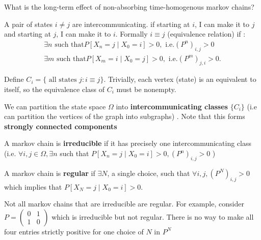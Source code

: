 \documentclass[a4paper]{article}
\begin{document}
\begin{note}
  What is the long-term effect of non-absorbing time-homogenous markov chains?
\end{note}

\begin{definition}
  A pair of states $i \neq j$ are intercommunicating. if starting at $i$, I can make it to  $j$ and starting at  $j$, I can make it to  $i$. Formally  $i \equiv j$ (equivalence relation) if :
   \begin{align*}
     \exists n \text{ such that} P[X_n=j \mid  X_0 = i] > 0, \text{ i.e.} (P^{n})_{i,j} > 0 \\
     \exists m \text{ such that} P[X_m=i \mid  X_0 = j] > 0, \text{ i.e.} (P^{m})_{j,i} > 0
  .\end{align*}
\end{definition}

\begin{definition}
  Define $C_i = \{\text{ all states } j: i \equiv j  \} $. Trivially, each vertex (state) is an equivalent to itself, so the equivalence class of  $C_i$ must be nonempty.
\end{definition}

\begin{theorem}
  We can partition the state space $\Omega$ into \textbf{intercommunicating classes}  $\{C_i\} $ (i.e can partition the vertices of the graph into subgraphs) .   Note that this forms \textbf{strongly connected components}
\end{theorem}

\begin{definition}
  A markov chain is \textbf{irreducible} if it has precisely one intercommunicating class (i.e. $\forall i,j \in \Omega, \exists n$ such that $P[X_n =j \mid  X_0 =i] > 0, (P^{n})_{i,j} > 0$ )
\end{definition}

\begin{definition}
  A markov chain is \textbf{regular} if $\exists N$, a single choice, such that $\forall i,j, (P^{N})_{i,j} > 0$ which implies that $P[X_N = j \mid X_0=i] > 0$.    
\end{definition}

\begin{note}
  Not all markov chains that are irreducible are regular. For example, consider $P = \begin{pmatrix}  0 & 1\\ 1 & 0 \end{pmatrix}$ which is irreducible but not regular. There is no way to make all four entries strictly positive for one choice of $N$ in  $P^{N}$ \end{note}
\end{document}
